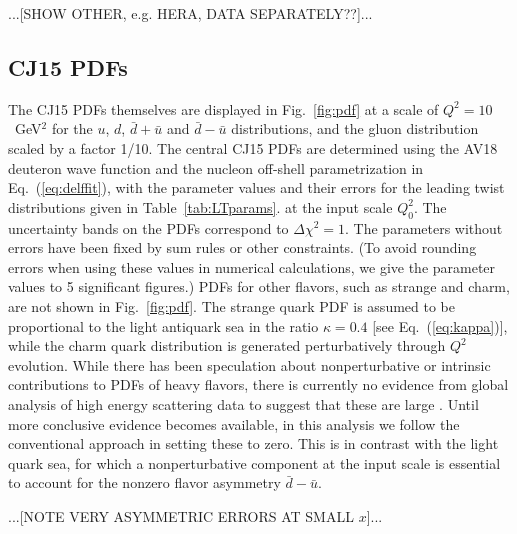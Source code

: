 \documentclass[aps,prd,amsmath,preprint]{revtex4}
\begin{document}
{\color{red} ...[SHOW OTHER, e.g. HERA, DATA SEPARATELY??]...}




\subsection{CJ15 PDFs}
\label{ssec:CJ15pdfs}

The CJ15 PDFs themselves are displayed in Fig.~\ref{fig:pdf} at a
scale of $Q^2=10$~GeV$^2$ for the $u$, $d$, $\bar d + \bar u$ and
$\bar d - \bar u$ distributions, and the gluon distribution scaled
by a factor 1/10.  The central CJ15 PDFs are determined using the
AV18 deuteron wave function and the nucleon off-shell parametrization
in Eq.~(\ref{eq:delffit}), with the parameter values and their errors
for the leading twist distributions given in Table~\ref{tab:LTparams}.
at the input scale $Q_0^2$.  The uncertainty bands on the PDFs
correspond to $\Delta\chi^2=1$.  The parameters without errors
have been fixed by sum rules or other constraints.
(To avoid rounding errors when using these values in numerical
calculations, we give the parameter values to 5 significant figures.)
%
PDFs for other flavors, such as strange and charm, are not shown
in Fig.~\ref{fig:pdf}.  The strange quark PDF is assumed to be
proportional to the light antiquark sea in the ratio $\kappa = 0.4$
[see Eq.~(\ref{eq:kappa})], while the charm quark distribution is
generated perturbatively through $Q^2$ evolution.
While there has been speculation about nonperturbative or intrinsic
contributions to PDFs of heavy flavors, there is currently no evidence
from global analysis of high energy scattering data to suggest that
these are large \cite{PedroIC15}.  Until more conclusive evidence
becomes available, in this analysis we follow the conventional
approach in setting these to zero.
This is in contrast with the light quark sea, for which a
nonperturbative component at the input scale is essential to
account for the nonzero flavor asymmetry $\bar d-\bar u$.

{\color{red} ...[NOTE VERY ASYMMETRIC ERRORS AT SMALL $x$]...}    
\end{document}
